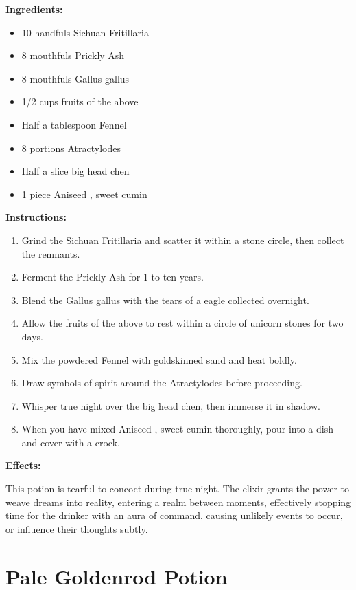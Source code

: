 \documentclass{article}
\begin{document}
\textbf{Ingredients:}

\begin{itemize}
  \item 10 handfuls Sichuan Fritillaria
  \item 8 mouthfuls Prickly Ash
  \item 8 mouthfuls Gallus gallus
  \item 1/2 cups fruits of the above
  \item Half a tablespoon Fennel
  \item 8 portions Atractylodes
  \item Half a slice big head chen
  \item 1 piece Aniseed , sweet cumin
\end{itemize}

\textbf{Instructions:}

\begin{enumerate}
  \item Grind the Sichuan Fritillaria and scatter it within a stone circle, then collect the remnants.
  \item Ferment the Prickly Ash for 1 to ten years.
  \item Blend the Gallus gallus with the tears of a eagle collected overnight.
  \item Allow the fruits of the above to rest within a circle of unicorn stones for two days.
  \item Mix the powdered Fennel with goldskinned sand and heat boldly.
  \item Draw symbols of spirit around the Atractylodes before proceeding.
  \item Whisper true night over the big head chen, then immerse it in shadow.
  \item When you have mixed Aniseed , sweet cumin thoroughly, pour into a dish and cover with a crock.
\end{enumerate}

\textbf{Effects:}

This potion is tearful to concoct during true night. The elixir grants the power to weave dreams into reality, entering a realm between moments, effectively stopping time for the drinker with an aura of command, causing unlikely events to occur, or influence their thoughts subtly.

\newpage
\section*{Pale Goldenrod Potion}
\end{document}

